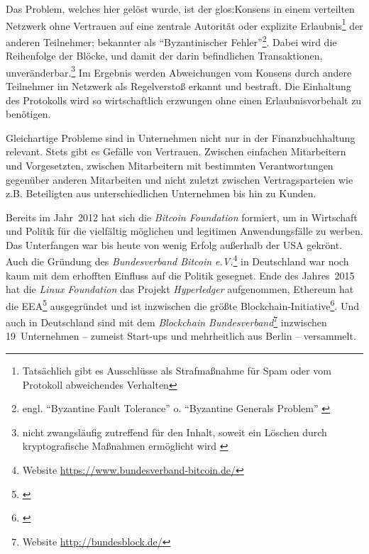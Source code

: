 Das Problem, welches hier gelöst wurde, ist der \gls{glos:Konsens} in einem verteilten Netzwerk ohne Vertrauen auf eine zentrale Autorität oder explizite Erlaubnis\footnote{Tatsächlich gibt es Ausschlüsse als Strafmaßnahme für Spam oder vom Protokoll abweichendes Verhalten} der anderen Teilnehmer; bekannter als \enquote{Byzantinischer Fehler}\footnote{engl. \enquote{Byzantine Fault Tolerance} o. \enquote{Byzantine Generals Problem} \autocite{p:byzantine-original}}.
Dabei wird die Reihenfolge der Blöcke, und damit der darin befindlichen Transaktionen, unveränderbar.\footnote{nicht zwangsläufig zutreffend für den Inhalt, soweit ein Löschen durch kryptografische Maßnahmen ermöglicht wird \autocite{w:accenture-patent}}
Im Ergebnis werden Abweichungen vom Konsens durch andere Teilnehmer im Netzwerk als Regelverstoß erkannt und bestraft.
Die Einhaltung des Protokolls wird so wirtschaftlich erzwungen ohne einen Erlaubnisvorbehalt zu benötigen.


Gleichartige Probleme sind in Unternehmen nicht nur in der Finanzbuchhaltung relevant.
Stets gibt es Gefälle von Vertrauen.
Zwischen
einfachen Mitarbeitern und Vorgesetzten,
zwischen Mitarbeitern mit bestimmten Verantwortungen gegenüber anderen Mitarbeiten
und nicht zuletzt
zwischen Vertragsparteien wie z.B. Beteiligten aus unterschiedlichen Unternehmen bis hin zu Kunden.


Bereits im Jahr~2012 hat sich die \emph{Bitcoin Foundation} formiert, um in Wirtschaft und Politik für die vielfältig möglichen und legitimen Anwendungsfälle zu werben.
Das Unterfangen war bis heute von wenig Erfolg außerhalb der USA gekrönt.
Auch die Gründung des \emph{Bundesverband Bitcoin e.V.}\footnote{Website \url{https://www.bundesverband-bitcoin.de/}} in Deutschland war noch kaum mit dem erhofften Einfluss auf die Politik gesegnet.
Ende des Jahres~2015 hat die \emph{Linux Foundation} das Projekt \emph{Hyperledger} aufgenommen, Ethereum hat die \gls{EEA}\footnote{%
\cite{p:eea}} ausgegründet und ist inzwischen die größte Blockchain-Initiative\footnote{\cite{w:eea:launch}}.
Und auch in Deutschland sind mit dem \emph{Blockchain Bundesverband}\footnote{Website \url{http://bundesblock.de/}} inzwischen 19~Unternehmen -- zumeist Start-ups und mehrheitlich aus Berlin -- versammelt.

